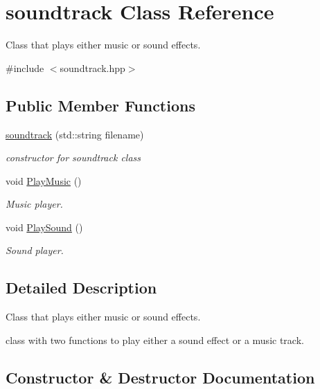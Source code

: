 \hypertarget{classsoundtrack}{}\section{soundtrack Class Reference}
\label{classsoundtrack}


Class that plays either music or sound effects.  




{\ttfamily \#include $<$soundtrack.\+hpp$>$}

\subsection*{Public Member Functions}
\begin{DoxyCompactItemize}
\item 
\hyperlink{classsoundtrack_add31bdeb1a693d541443f1d88586d3b6}{soundtrack} (std\+::string filename)
\begin{DoxyCompactList}\small\item\em constructor for soundtrack class \end{DoxyCompactList}\item 
void \hyperlink{classsoundtrack_a9bc49316f0c8607aef388728d2ca28db}{Play\+Music} ()
\begin{DoxyCompactList}\small\item\em Music player. \end{DoxyCompactList}\item 
void \hyperlink{classsoundtrack_a3c86452d68b41eea981d0df4984713e8}{Play\+Sound} ()
\begin{DoxyCompactList}\small\item\em Sound player. \end{DoxyCompactList}\end{DoxyCompactItemize}


\subsection{Detailed Description}
Class that plays either music or sound effects. 

class with two functions to play either a sound effect or a music track. 

\subsection{Constructor \& Destructor Documentation}
